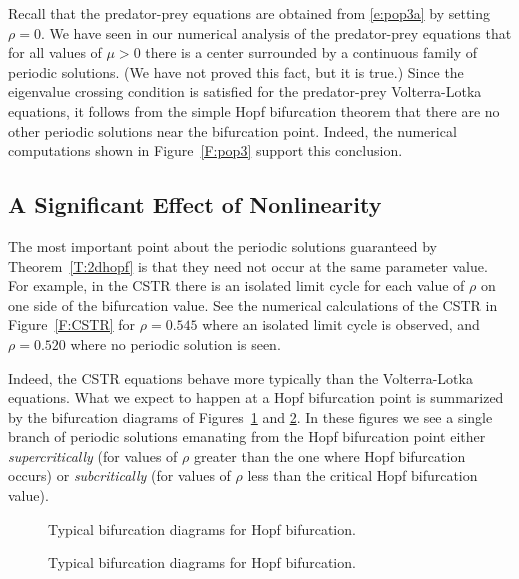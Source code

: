 \documentclass{ximera}
\begin{document}
Recall that the predator-prey equations are obtained from \eqref{e:pop3a}
by setting $\rho=0$.  We have seen in our numerical analysis of the 
predator-prey equations that for all values of $\mu>0$ there is a center 
surrounded by a continuous family of periodic solutions.  (We 
have not proved this fact, but it is true.)  Since the eigenvalue 
crossing condition is satisfied for the predator-prey Volterra-Lotka 
equations, it follows from the simple Hopf bifurcation theorem that 
there are no other periodic solutions near the bifurcation point. 
  Indeed, the numerical computations 
shown in Figure~\ref{F:pop3} support this conclusion.

\subsection*{A Significant Effect of Nonlinearity}

The most important point about the periodic solutions guaranteed by 
Theorem~\ref{T:2dhopf} is that they need not occur at the same parameter 
value. For example, in the CSTR there is an isolated limit cycle for each 
value of $\rho$ on one side of the bifurcation value.  See the numerical 
calculations of the CSTR in Figure~\ref{F:CSTR} for $\rho=0.545$ where an
isolated limit cycle is observed, and $\rho=0.520$ where no periodic
solution is seen. 

Indeed, the CSTR equations behave more typically than the 
Volterra-Lotka equations.  What we expect to happen at a Hopf bifurcation 
point is summarized by the bifurcation diagrams of Figures~\ref{F:hopf} and 
\ref{F:hopf2}.  In these figures we see a single branch of periodic solutions 
emanating from the Hopf bifurcation point either 
{\em supercritically\/} (for 
values of $\rho$ greater than the one where Hopf bifurcation occurs) or 
{\em subcritically\/} 
(for values of $\rho$ less than the critical Hopf bifurcation value).

\begin{figure}[htb]
           \centerline{%
	   }
           \caption{Typical bifurcation diagrams for Hopf bifurcation.}
           \label{F:hopf}
\end{figure}

\begin{figure}[htb]
           \centerline{%
	   }
           \caption{Typical bifurcation diagrams for Hopf bifurcation.}
           \label{F:hopf2}
\end{figure}
\end{document}
